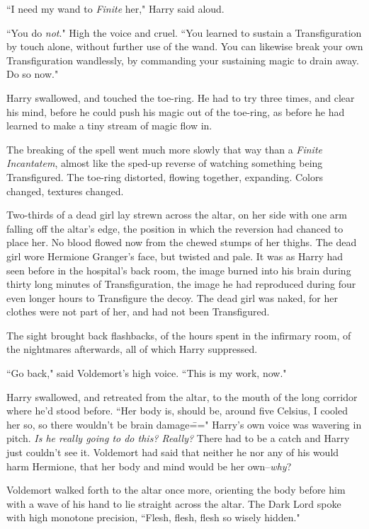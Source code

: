 ``I need my wand to \emph{Finite} her," Harry said aloud.

``You do \emph{not}." High the voice and cruel. ``You learned to sustain a Transfiguration by touch alone, without further use of the wand. You can likewise break your own Transfiguration wandlessly, by commanding your sustaining magic to drain away. Do so now."

Harry swallowed, and touched the toe-ring. He had to try three times, and clear his mind, before he could push his magic out of the toe-ring, as before he had learned to make a tiny stream of magic flow in.

The breaking of the spell went much more slowly that way than a \emph{Finite Incantatem}, almost like the sped-up reverse of watching something being Transfigured. The toe-ring distorted, flowing together, expanding. Colors changed, textures changed.

Two-thirds of a dead girl lay strewn across the altar, on her side with one arm falling off the altar's edge, the position in which the reversion had chanced to place her. No blood flowed now from the chewed stumps of her thighs. The dead girl wore Hermione Granger's face, but twisted and pale. It was as Harry had seen before in the hospital's back room, the image burned into his brain during thirty long minutes of Transfiguration, the image he had reproduced during four even longer hours to Transfigure the decoy. The dead girl was naked, for her clothes were not part of her, and had not been Transfigured.

The sight brought back flashbacks, of the hours spent in the infirmary room, of the nightmares afterwards, all of which Harry suppressed.

``Go back," said Voldemort's high voice. ``This is my work, now."

Harry swallowed, and retreated from the altar, to the mouth of the long corridor where he'd stood before. ``Her body is, should be, around five Celsius, I cooled her so, so there wouldn't be brain damage\===" Harry's own voice was wavering in pitch. \emph{Is he really going to do this? Really?} There had to be a catch and Harry just couldn't see it. Voldemort had said that neither he nor any of his would harm Hermione, that her body and mind would be her own\---\emph{why}?

Voldemort walked forth to the altar once more, orienting the body before him with a wave of his hand to lie straight across the altar. The Dark Lord spoke with high monotone precision, ``Flesh, flesh, flesh so wisely hidden."

